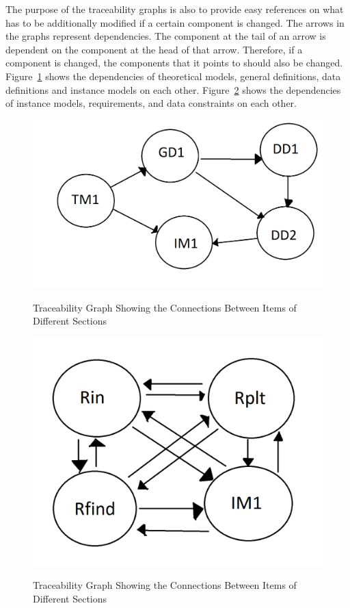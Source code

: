 \documentclass[12pt]{article}
\begin{document}
The purpose of the traceability graphs is also to provide easy references on
what has to be additionally modified if a certain component is changed.  The
arrows in the graphs represent dependencies. The component at the tail of an
arrow is dependent on the component at the head of that arrow. Therefore, if a
component is changed, the components that it points to should also be
changed. Figure~\ref{Fig_ATrace} shows the dependencies of theoretical models,
general definitions, data definitions and instance models on each other. 
Figure~\ref{Fig_RTrace} shows the dependencies of
instance models, requirements, and data constraints on each other.

\begin{figure}[h!]
	\begin{center}
		{
			\includegraphics[width=\textwidth]{ATrace.png}
		}
		\caption{\label{Fig_ATrace} Traceability Graph Showing the Connections 
		Between Items of Different Sections}
 	\end{center}
 \end{figure}

\begin{figure}[h!]
	\begin{center}
		{
			\includegraphics[width=\textwidth]{RTrace.png}
		}
 		\caption{\label{Fig_RTrace} Traceability Graph Showing the Connections 
 			Between Items of Different Sections}
	\end{center}
\end{figure}
\end{document}
